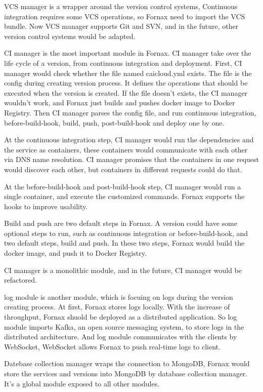 \begin{bigabstract}
VCS manager is a wrapper around the version control systems, Continuous integration requires some VCS operations, so Fornax need to import the VCS bundle. Now VCS manager supports Git and SVN, and in the future, other version control systems would be adapted.

CI manager is the most important module in Fornax. CI manager take over the life cycle of a version, from continuous integration and deployment. First, CI manager would check whether the file named caicloud.yml exists. The file is the config during creating version process. It defines the operations that should be executed when the version is created. If the file doesn't exists, the CI manager wouldn't work, and Fornax just builds and pushes docker image to Docker Registry. Then CI manager parses the config file, and run continuous integration, before-build-hook, build, push, post-build-hook and deploy one by one. 

At the continuous integration step, CI manager would run the dependencies and the service as containers, these containers would communicate with each other via DNS name resolution. CI manager promises that the containers in one request would discover each other, but containers in different requests could do that. 

At the before-build-hook and post-build-hook step, CI manager would run a single container, and execute the customized commands. Fornax supports the hooks to improve usability.

Build and push are two default steps in Fornax. A version could have some optional steps to run, such as continuous integration or before-build-hook, and two default steps, build and push. In these two steps, Fornax would build the docker image, and push it to Docker Registry.

CI manager is a monolithic module, and in the future, CI manager would be refactored.

log module is another module, which is focuing on logs during the version creating process. At first, Fornax stores logs locally. With the increase of throughput, Fornax shuold be deployed as a distributed application. So log module imports Kafka, an open source messaging system, to store logs in the distributed architecture. And log module communicates with the clients by WebSocket, WebSocket allows Fornax to push real-time logs to client.

Datebase collection manager wraps the connection to MongoDB, Fornax would store the services and versions into MongoDB by database collection manager. It's a global module exposed to all other modules.


\end{bigabstract}
